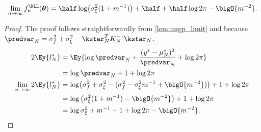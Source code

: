 \begin{corollary}
\label{cor:nll_limit}
    \[
        \lim_{n\rightarrow\infty}f_n^{\NLL}(\bm{\theta}) = \half\log(\sigma_\xi^2(1+m^{-1})) +\half + \half\log2\pi - \bigO{m^{-2}}.
    \]
\end{corollary}
\begin{proof}\label{proof:nll_limit}
    The proof follows straightforwardly from \autoref{lem:nngp_limit} and because \(\predvar_N = \sigma_f^2 + \sigma_\xi^2 - \kstar_N^TK_N^{-1}\kstar_N\).
    \begin{align*}
        2\Ey{l^*_N} &= \Ey{\log\predvar_N + \frac{(y^*-\mu_N^*)^2}{\predvar_N} + \log2\pi } \\
        &= \log\predvar_N + 1 + \log2\pi \\
        \lim_{n\rightarrow\infty}2\Ey{l^*_N} &= \log(\sigma_f^2 + \sigma_\xi^2 -(\sigma_f^2 - \sigma_\xi^2 m^{-1} + \bigO{m^{-2}})) + 1 + \log2\pi \\
        &= \log\left(\sigma_\xi^2(1+m^{-1}) - \bigO{m^{-2}}\right) +1 + \log2\pi \\
        &= \log\sigma_\xi^2 + m^{-1} + 1 + \log2\pi - \bigO{m^{-2}}.
    \end{align*}
\end{proof}

